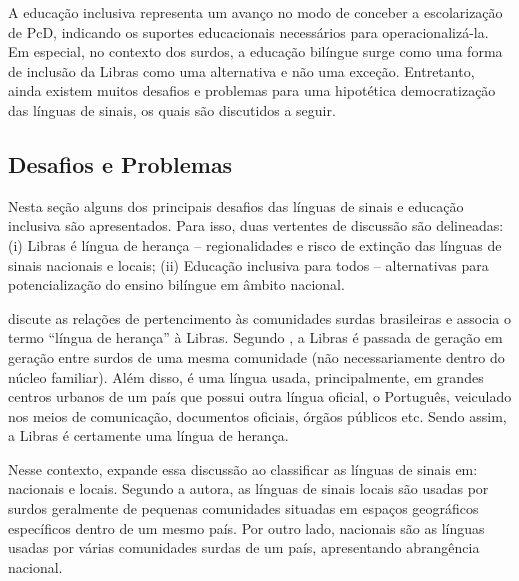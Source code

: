
A educação inclusiva representa um avanço no modo de conceber a escolarização de PcD, indicando os suportes educacionais necessários para operacionalizá-la. Em especial, no contexto dos surdos, a educação bilíngue surge como uma forma de inclusão da Libras como uma alternativa e não uma exceção. Entretanto, ainda existem muitos desafios e problemas para uma hipotética democratização das línguas de sinais, os quais são discutidos a seguir.

\subsection{Desafios e Problemas}
\label{fundamentacao-teorica:linguas-sinais:desafios}

Nesta seção alguns dos principais desafios das línguas de sinais e educação inclusiva são apresentados. Para isso, duas vertentes de discussão são delineadas: (i) Libras é língua de herança -- regionalidades e risco de extinção das línguas de sinais nacionais e locais; (ii) Educação inclusiva para todos -- alternativas para potencialização do ensino bilíngue em âmbito nacional. 

 discute as relações de pertencimento às comunidades surdas brasileiras e associa o termo ``língua de herança'' à Libras. Segundo , a Libras é passada de geração em geração entre surdos de uma mesma comunidade (não necessariamente dentro do núcleo familiar). Além disso, é uma língua usada, principalmente, em grandes centros urbanos de um país que possui outra língua oficial, o Português, veiculado nos meios de comunicação, documentos oficiais, órgãos públicos etc. Sendo assim, a Libras é certamente uma língua de herança.

Nesse contexto,  expande essa discussão ao classificar as línguas de sinais em: nacionais e locais. Segundo a autora, as línguas de sinais locais são usadas por surdos geralmente de pequenas comunidades situadas em espaços geográficos específicos dentro de um mesmo país. Por outro lado, nacionais são as línguas usadas por várias comunidades surdas de um país, apresentando abrangência nacional. 

